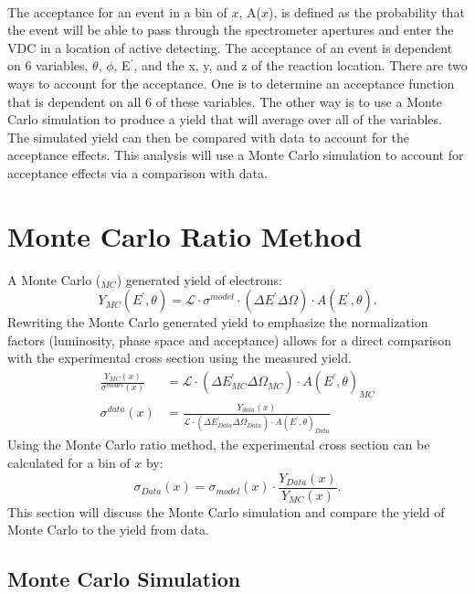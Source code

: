 \paragraph{} The acceptance for an event in a bin of $x$, A($x$), is defined as the probability that the event will be able to pass through the spectrometer apertures and enter the VDC in a location of active detecting. The acceptance of an event is dependent on 6 variables, $\theta$, $\phi$, E$^{\prime}$, and the x, y, and z of the reaction location. There are two ways to account for the acceptance. One is to determine an acceptance function that is dependent on all 6 of these variables. The other way is to use a Monte Carlo simulation to produce a yield that will average over all of the variables. The simulated yield can then be compared with data to account for the acceptance effects. This analysis will use a Monte Carlo simulation to account for acceptance effects via a comparison with data.
 \section{Monte Carlo Ratio Method}
 A Monte Carlo ($_{MC}$) generated yield of electrons:
\begin{equation}
Y_{MC}(E^{\prime},\theta) = \mathscr{L} \cdot \sigma^{model} \cdot (\Delta E^{\prime} \Delta \Omega) \cdot A(E^{\prime},\theta).
\end{equation}
Rewriting the Monte Carlo generated yield to emphasize the normalization factors (luminosity, phase space and acceptance) allows for a direct comparison with the experimental cross section using the measured yield.
\begin{align}
\frac{Y_{MC}(x)}{\sigma^{model}(x)} &= \mathscr{L} \cdot (\Delta E^{\prime}_{MC} \Delta \Omega_{MC}) \cdot A(E^{\prime},\theta)_{MC} \\
\sigma^{data}(x) &= \frac{Y_{data}(x)}{ \mathscr{L} \cdot (\Delta E^{\prime}_{Data} \Delta \Omega_{Data}) \cdot A(E^{\prime},\theta)_{Data} }
\end{align}
Using the Monte Carlo ratio method, the experimental cross section can be calculated for a bin of $x$ by:
\begin{equation}
\sigma_{Data}(x) = \sigma_{model}(x) \cdot \frac{Y_{Data}(x)}{Y_{MC}(x)}.
\end{equation} 
This section will discuss the Monte Carlo simulation and compare the yield of Monte Carlo to the yield from data.

\subsection{Monte Carlo Simulation}

